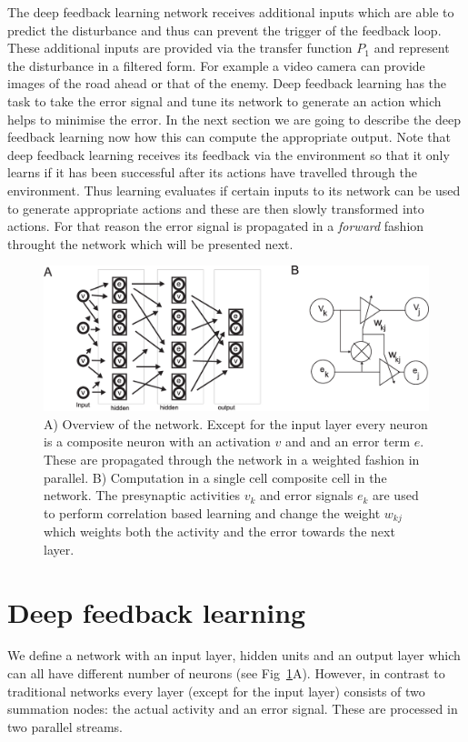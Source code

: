\documentclass{llncs}
\begin{document}
The deep feedback learning network receives additional inputs which are able
to predict the disturbance and thus can prevent the trigger of the feedback
loop. These additional inputs are provided via the transfer function $P_1$
and represent the disturbance in a filtered form. For example a video camera
can provide images of the road ahead or that of the enemy. Deep feedback
learning has the task to take the error signal and tune its network
to generate an action which helps to minimise the error. In the next section
we are going to describe the deep feedback learning now how this can
compute the appropriate output. Note that deep feedback learning receives
its feedback via the environment so that it only learns if it has been
successful after its actions have travelled through the environment. Thus learning
evaluates if certain inputs to its network can be used to generate
appropriate actions and these are then slowly transformed into actions.
For that reason the error signal is propagated in a \textsl{forward} fashion
throught the network which will be presented next.

\begin{figure}[h!]
  \centering
  \includegraphics[width=\columnwidth]{netw_together}
  \caption{A) Overview of the network. Except for the input layer
    every neuron is a composite neuron with an activation $v$ and
    and an error term $e$. These are propagated through the network
    in a weighted fashion in parallel.
B) Computation in a single cell composite cell in the network.
    The presynaptic activities $v_k$ and error signals $e_k$ are used
    to perform correlation based learning and change the weight $w_{kj}$
    which weights both the activity and the error towards the next
    layer.\label{netw_together}}
\end{figure}


\section{Deep feedback learning}
We define a network with an input layer, hidden units and an output
layer which can all have different number of neurons (see
Fig~\ref{netw_together}A). However, in contrast to traditional
networks every layer (except for the input layer) consists of two
summation nodes: the actual activity and an error signal. These
are processed in two parallel streams.
\end{document}
